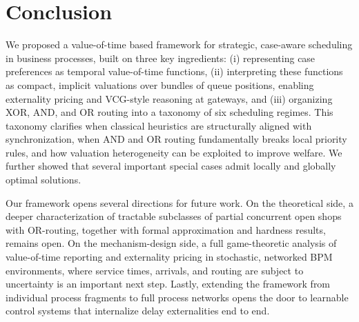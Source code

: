 \documentclass[letterpaper]{article}
\begin{document}

\section{Conclusion}
\label{sec:conclusion}


We proposed a value-of-time based framework for strategic, case-aware scheduling
in business processes, built on three key ingredients:
(i) representing case preferences as temporal value-of-time functions,
(ii) interpreting these functions as compact, implicit valuations over bundles of
queue positions, enabling externality pricing and VCG-style reasoning at gateways,
and (iii) organizing XOR, AND, and OR routing into a taxonomy of six
scheduling regimes.
This taxonomy clarifies when classical heuristics are structurally aligned
with synchronization, when AND and OR routing fundamentally breaks local priority rules,
and how valuation heterogeneity can be exploited to improve welfare. We further showed that several
important special cases admit locally and globally optimal solutions.

Our framework opens several directions for future work. On the theoretical side,
a deeper characterization of tractable subclasses of partial concurrent open shops
with OR-routing, together with formal approximation and hardness results, remains open.
On the mechanism-design side, a full game-theoretic analysis of value-of-time reporting
and externality pricing in stochastic, networked BPM environments, where service times,
arrivals, and routing are subject to uncertainty is an important next step.
Lastly, extending the framework from individual process fragments to full process networks opens the door to learnable control systems that internalize delay externalities end to end.
\end{document}

